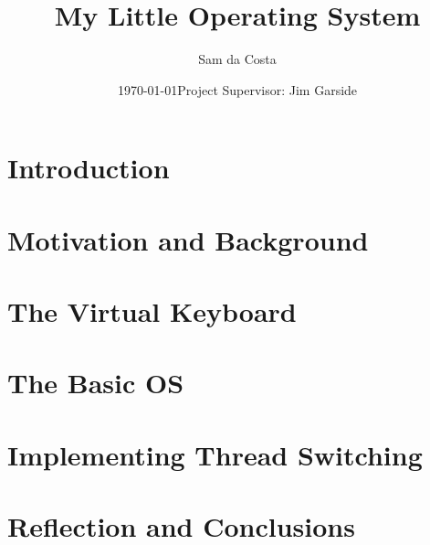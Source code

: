 \documentclass[11pt]{article}
\title{ My Little Operating System }
\author{ Sam da Costa }
\date{\today \endgraf \bigskip Project Supervisor: Jim Garside}
\begin{document}
\maketitle	
\pagebreak


\tableofcontents
\pagebreak


\section{Introduction}

\pagebreak
\section{Motivation and Background}

\pagebreak
\section{The Virtual Keyboard}

\pagebreak
\section{The Basic OS}

\pagebreak
\section{Implementing Thread Switching}

\pagebreak
\section{Reflection and Conclusions}

\pagebreak

\pagebreak
\end{document}
